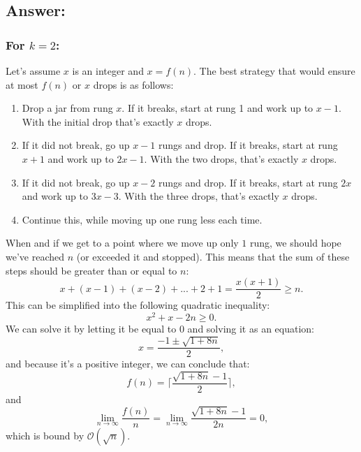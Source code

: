 \documentclass[12pt, letterpaper]{article}
\begin{document}
\clearpage
\subsection*{Answer:}
\subsubsection*{For $k = 2$:}
Let's assume $x$ is an integer and $x = f(n)$. The best strategy that would ensure at most $f(n)$ or $x$ drops is as follows:
\begin{enumerate}
    \item Drop a jar from rung $x$. If it breaks, start at rung 1 and work up to $x - 1$. With the initial drop that's exactly $x$ drops.
    \item If it did not break, go up $x - 1$ rungs and drop. If it breaks, start at rung $x + 1$ and work up to $2x - 1$. With the two drops, that's exactly $x$ drops.
    \item If it did not break, go up $x - 2$ rungs and drop. If it breaks, start at rung $2x$ and work up to $3x - 3$. With the three drops, that's exactly $x$ drops.
    \item Continue this, while moving up one rung less each time.
\end{enumerate}
When and if we get to a point where we move up only $1$ rung, we should hope we've reached $n$ (or exceeded it and stopped).
This means that the sum of these steps should be greater than or equal to $n$:
\begin{equation*}
    x + (x - 1) + (x - 2) + ... + 2 + 1 = \frac{x(x + 1)}{2} \geq n .
\end{equation*}
This can be simplified into the following quadratic inequality:
\begin{equation*}
    x^2 + x - 2n \geq 0 .
\end{equation*}
We can solve it by letting it be equal to $0$ and solving it as an equation:
\begin{equation*}
    x = \frac{-1 \pm \sqrt{1 + 8n}}{2},
\end{equation*}
and because it's a positive integer, we can conclude that:
\begin{equation*}
    f(n) = \lceil\frac{\sqrt{1 + 8n} - 1}{2}\rceil ,
\end{equation*}
and
\begin{equation*}
    \lim_{n \to \infty}{\frac{f(n)}{n}} = \lim_{n \to \infty}{\frac{\sqrt{1 + 8n} - 1}{2n}} = 0 ,
\end{equation*}
which is bound by $\mathcal{O}(\sqrt{n})$.
\end{document}
